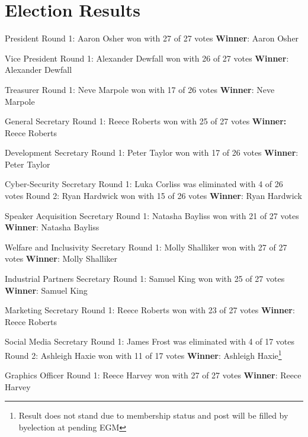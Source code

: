 \documentclass[11pt]{meetingmins}
\begin{document}
\section{Election Results}
\begin{items}
	\item
	President
		\subitem
		Round 1: Aaron Osher won with 27 of 27 votes
		\subitem
		\textbf{Winner}: Aaron Osher
		
	\item
	Vice President
		\subitem
		Round 1: Alexander Dewfall won with 26 of 27 votes
		\subitem
		\textbf{Winner}: Alexander Dewfall
		
	\item
	Treasurer
		\subitem
		Round 1: Neve Marpole won with 17 of 26 votes
		\subitem
		\textbf{Winner}: Neve Marpole
		
	\item
	General Secretary
		\subitem
		Round 1: Reece Roberts won with 25 of 27 votes
		\subitem
		\textbf{Winner:} Reece Roberts
		
	\item
	Development Secretary
		\subitem
		Round 1: Peter Taylor won with 17 of 26 votes
		\subitem
		\textbf{Winner}: Peter Taylor
	
	\item
	Cyber-Security Secretary
		\subitem
		Round 1: Luka Corliss was eliminated with 4 of 26 votes
		\subitem
		Round 2: Ryan Hardwick won with 15 of 26 votes
		\subitem
		\textbf{Winner}: Ryan Hardwick
		
	\item
	Speaker Acquisition Secretary
		\subitem
		Round 1: Natasha Bayliss won with 21 of 27 votes
		\subitem
		\textbf{Winner}: Natasha Bayliss
		
	\item
	Welfare and Inclusivity Secretary
		\subitem
		Round 1: Molly Shalliker won with 27 of 27 votes
		\subitem
		\textbf{Winner}: Molly Shalliker
		
	\item
	Industrial Partners Secretary
		\subitem
		Round 1: Samuel King won with 25 of 27 votes
		\subitem
		\textbf{Winner}: Samuel King
		
	\item
	Marketing Secretary
		\subitem
		Round 1: Reece Roberts won with 23 of 27 votes
		\subitem
		\textbf{Winner}: Reece Roberts
		
	\item
	Social Media Secretary
		\subitem
		Round 1: James Frost was eliminated with 4 of 17 votes
		\subitem
		Round 2: Ashleigh Haxie won with 11 of 17 votes
		\subitem
		\textbf{Winner}: Ashleigh Haxie\footnote{Result does not stand due to membership status and post will be filled by byelection at pending EGM}
		
	\item
	Graphics Officer
		\subitem
		Round 1: Reece Harvey won with 27 of 27 votes
		\subitem
		\textbf{Winner}: Reece Harvey
\end{items}
\end{document}
